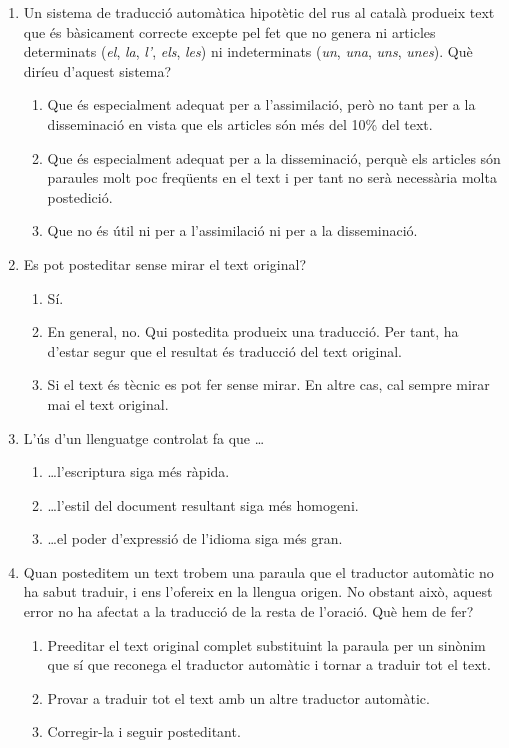 \begin{enumerate}
\item Un sistema de traducció automàtica hipotètic del rus al català
  produeix text que és bàsicament correcte excepte pel fet que no
  genera ni articles determinats (\emph{el}, \emph{la}, \emph{l'},
  \emph{els}, \emph{les}) ni indeterminats (\emph{un}, \emph{una},
  \emph{uns}, \emph{unes}). Què diríeu d'aquest sistema?
\begin{enumerate}
\item Que és especialment adequat per a l'assimilació, però
    no tant per a la disseminació en vista que els articles són més
    del 10\% del text.  
\item Que és especialment adequat per a la
    disseminació, perquè els articles són paraules molt poc freqüents
    en el text i per tant no serà necessària molta postedició.
\item Que no és útil ni per a l'assimilació ni per a la
    disseminació.
\end{enumerate}

\item Es pot posteditar sense mirar el text original?  
  \begin{enumerate}
  \item Sí.  
  \item En general, no. Qui postedita produeix una traducció. Per
    tant, ha d'estar segur que el resultat és traducció del text
    original.  
  \item Si el text és tècnic es pot fer sense mirar. En altre cas, cal
    sempre mirar mai el text original.
  \end{enumerate}

\item L'ús d'un llenguatge controlat fa que \ldots 
  \begin{enumerate}
  \item \ldots l'escriptura siga més ràpida.
  \item \ldots l'estil del document resultant siga més homogeni.
  \item \ldots el poder d'expressió de l'idioma siga més gran.
  \end{enumerate}

\item Quan posteditem un text trobem una paraula que el traductor
  automàtic no ha sabut traduir, i ens l'ofereix en la llengua
  origen. No obstant això, aquest error no ha afectat a la traducció
  de la resta de l'oració. Què hem de fer?
  \begin{enumerate}
  \item Preeditar el text original complet substituint la paraula per un sinònim que sí que reconega el traductor automàtic i tornar a traduir tot el text.
  \item Provar a traduir tot el text amb un altre traductor automàtic.
  \item Corregir-la i seguir posteditant.
  \end{enumerate}



\end{enumerate}

